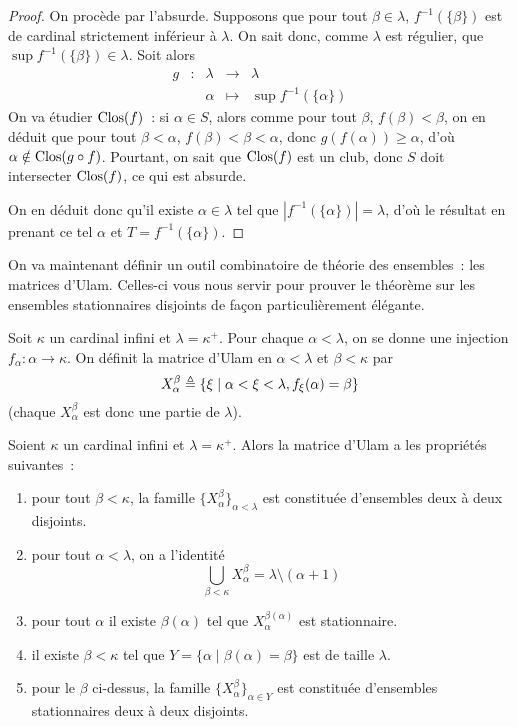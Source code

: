 \begin{proof}
  On procède par l'absurde. Supposons que pour tout $\beta \in \lambda$,
  $f^{-1}(\{\beta\})$ est de cardinal strictement inférieur à $\lambda$. On sait
  donc, comme $\lambda$ est régulier, que $\sup f^{-1}(\{\beta\})\in \lambda$.
  Soit alors
  \[\begin{array}{ccccc}
  g & : & \lambda & \longrightarrow & \lambda\\
  & & \alpha & \longmapsto & \sup f^{-1}(\{\alpha\})
  \end{array}\]
  On va étudier $\operatorname{Clos}(f)$~: si $\alpha \in S$, alors comme pour tout $\beta$,
  $f(\beta) < \beta$, on en déduit que pour tout $\beta < \alpha$,
  $f(\beta) < \beta < \alpha$, donc $g(f(\alpha)) \geq \alpha$, d'où
  $\alpha \notin \operatorname{Clos}(g\circ f)$. Pourtant, on sait que $\operatorname{Clos}(f)$ est un club,
  donc $S$ doit intersecter $\operatorname{Clos}(f)$, ce qui est absurde.

  On en déduit donc qu'il existe $\alpha \in \lambda$ tel que
  $|f^{-1}(\{\alpha\})| = \lambda$, d'où le résultat en prenant ce tel $\alpha$
  et $T = f^{-1}(\{\alpha\})$.
\end{proof}

On va maintenant définir un outil combinatoire de théorie des ensembles~: les
matrices d'Ulam. Celles-ci vous nous servir pour prouver le théorème sur les
ensembles stationnaires disjoints de façon particulièrement élégante.

\begin{definition}
  Soit $\kappa$ un cardinal infini et $\lambda = \kappa^+$. Pour chaque
  $\alpha < \lambda$, on se donne une injection $f_\alpha : \alpha \to\kappa$.
  On définit la matrice d'Ulam en $\alpha < \lambda$ et $\beta < \kappa$ par
  \[X_\alpha^\beta \triangleq
  \{\xi \mid \alpha < \xi < \lambda, f_\xi(\alpha) = \beta\}\]
  (chaque $X_\alpha^\beta$ est donc une partie de $\lambda$).
\end{definition}

\begin{property}
  Soient $\kappa$ un cardinal infini et $\lambda = \kappa^+$. Alors la matrice
  d'Ulam a les propriétés suivantes~:
  \begin{enumerate}[label=(\roman*)]
  \item\label{enum.ulam1} pour tout $\beta < \kappa$, la famille
    $\{X_\alpha^\beta\}_{\alpha < \lambda}$ est constituée d'ensembles deux à deux
    disjoints.
  \item\label{enum.ulam2} pour tout $\alpha < \lambda$, on a l'identité
    \[\bigcup_{\beta < \kappa} X_\alpha^\beta = \lambda \setminus (\alpha + 1)\]
  \item pour tout $\alpha$ il existe $\beta(\alpha)$ tel que
    $X_\alpha^{\beta(\alpha)}$ est stationnaire.
  \item il existe $\beta < \kappa$ tel que
    $Y = \{\alpha \mid \beta(\alpha) = \beta\}$ est de taille $\lambda$.
  \item pour le $\beta$ ci-dessus, la famille
    $\{X_\alpha^\beta\}_{\alpha \in Y}$ est constituée d'ensembles stationnaires
    deux à deux disjoints.
  \end{enumerate}
\end{property}

